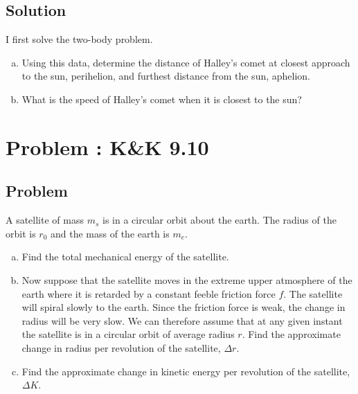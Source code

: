 \documentclass[solutions]{esg8012pset}
\begin{document}
\subsection{Solution}
I first solve the two-body problem.

% 
%
%


\begin{enumerate}[(a)]
  \item Using this data, determine the distance of Halley's comet at closest approach to the sun, perihelion, and furthest distance from the sun, aphelion.
  \item What is the speed of Halley's comet when it is closest to the sun?
\end{enumerate}
\section{Problem \thesection: K\&K 9.10}
\subsection{Problem}
  A satellite of mass $m_s$ is in a circular orbit about the earth. The radius of the orbit is $r_0$ and the mass of the earth is $m_e$.
  \begin{enumerate}[(a)]
    \item Find the total mechanical energy of the satellite.
    \item Now suppose that the satellite moves in the extreme upper atmosphere of the earth where it is retarded by a constant feeble friction force $f$. The satellite will spiral slowly to the earth. Since the friction force is weak, the change in radius will be very slow. We can therefore assume that at any given instant the satellite is in a circular orbit of average radius $r$. Find the approximate change in radius per revolution of the satellite, $\Delta r$.
    \item Find the approximate change in kinetic energy per revolution of the satellite, $\Delta K$.
  \end{enumerate}
\end{document}
